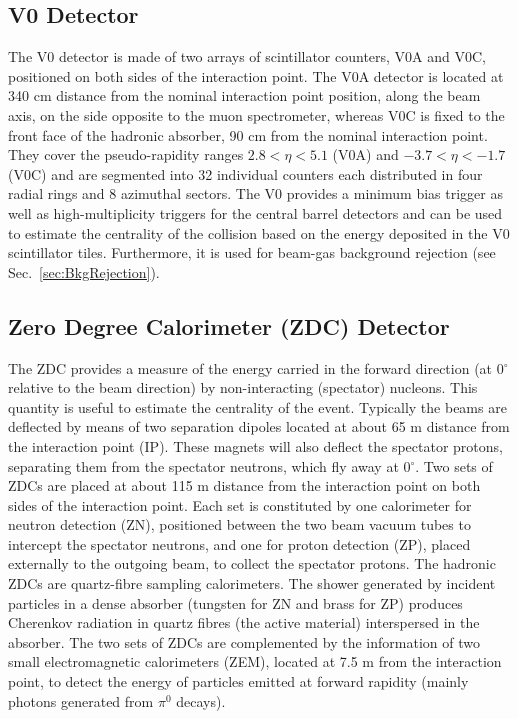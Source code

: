 \subsection{V0 Detector} 
\label{sec:V0}
The V0 detector is made of two arrays of scintillator counters, V0A and V0C, positioned on both sides of 
the interaction point. The V0A detector is located at 340 cm distance from the nominal interaction point position, 
along the beam axis, on the side opposite to the muon spectrometer,
whereas V0C is fixed to the front face of the hadronic absorber, 90 cm from the nominal interaction point. They cover
the pseudo-rapidity ranges $2.8 < \eta < 5.1$ (V0A) and $-3.7 < \eta < -1.7$ (V0C) and are segmented
into 32 individual counters each distributed in four radial rings and 8 azimuthal sectors. 
The V0 provides a minimum bias trigger as well as high-multiplicity triggers for the central barrel detectors and
  can be used to estimate the centrality of the collision based on the energy deposited in the V0 scintillator tiles.
Furthermore, it is used for beam-gas background rejection (see Sec.~\ref{sec:BkgRejection}).


\subsection{Zero Degree Calorimeter (ZDC) Detector} 
\label{sec:ZDC}
The ZDC provides a measure of the energy carried in the forward direction (at 0$^\circ$ relative
to the beam direction) by non-interacting (spectator) nucleons. This quantity is
useful to estimate the centrality of the event. Typically the beams are deflected by means 
of two separation dipoles located at about 65 m distance from the interaction point (IP). These magnets will also deflect the spectator
 protons, separating them from the spectator neutrons, which fly away at 0$^\circ$. 
Two sets of ZDCs are placed at about 115 m distance from the 
 interaction point on both sides of the interaction point. Each set is constituted by one 
 calorimeter for neutron detection (ZN), positioned between the two 
 beam vacuum tubes to intercept the spectator neutrons, and one for proton detection (ZP), placed externally 
 to the outgoing beam, to collect the spectator protons. 
  The hadronic ZDCs are quartz-fibre sampling calorimeters. The shower generated by incident
particles in a dense absorber (tungsten for ZN and brass for ZP) produces 
Cherenkov radiation in quartz fibres (the active material) interspersed in the absorber.
The two sets of ZDCs are complemented by the information of two small 
electromagnetic calorimeters (ZEM), located at 7.5 m from the interaction
 point, to detect the  energy of particles emitted at forward rapidity (mainly photons generated from $\pi^0$ decays).




